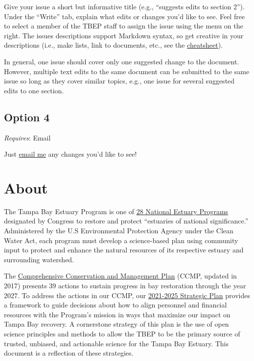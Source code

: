 \documentclass[
]{book}
\begin{document}
Give your issue a short but informative title (e.g., ``suggests edits to section 2''). Under the ``Write'' tab, explain what edits or changes you'd like to see. Feel free to select a member of the TBEP staff to assign the issue using the menu on the right. The issues descriptions support Markdown syntax, so get creative in your descriptions (i.e., make lists, link to documents, etc., see the \href{https://rstudio.com/wp-content/uploads/2015/03/rmarkdown-reference.pdf}{cheatsheet}).

In general, one issue should cover only one suggested change to the document. However, multiple text edits to the same document can be submitted to the same issue so long as they cover similar topics, e.g., one issue for several suggested edits to one section.

\hypertarget{opt4}{%
\subsection{Option 4}\label{opt4}}

\emph{Requires}: Email

Just \href{mailto:mbeck@tbep.org}{email me} any changes you'd like to see!

\hypertarget{about}{%
\section{About}\label{about}}

The Tampa Bay Estuary Program is one of \href{http://nationalestuaries.org/}{28 National Estuary Programs} designated by Congress to restore and protect ``estuaries of national significance.'' Administered by the U.S Environmental Protection Agency under the Clean Water Act, each program must develop a science-based plan using community input to protect and enhance the natural resources of its respective estuary and surrounding watershed.

The \href{http://ccmp.tbep.org/}{Comprehensive Conservation and Management Plan} (CCMP, updated in 2017) presents 39 actions to sustain progress in bay restoration through the year 2027. To address the actions in our CCMP, our \href{https://drive.google.com/file/d/11xohuoaHDxNHRqgXoOHdI37FpWvac_rn/view}{2021-2025 Strategic Plan} provides a framework to guide decisions about how to align personnel and financial resources with the Program's mission in ways that maximize our impact on Tampa Bay recovery. A cornerstone strategy of this plan is the use of open science principles and methods to allow the TBEP to be the primary source of trusted, unbiased, and actionable science for the Tampa Bay Estuary. This document is a reflection of these strategies.
\end{document}
